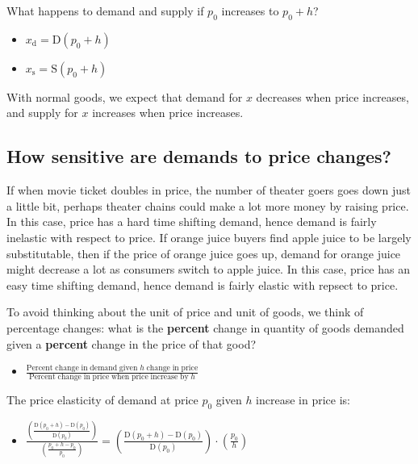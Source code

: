 \documentclass[
]{book}
\providecommand{\tightlist}{%
  \setlength{\itemsep}{0pt}\setlength{\parskip}{0pt}}
\begin{document}
What happens to demand and supply if \(p_0\) increases to \(p_0 +h\)?

\begin{itemize}
\item
  \(\displaystyle x_{\textrm{d}} =\textrm{D}(p_0 +h)\)
\item
  \(\displaystyle x_{\textrm{s}} =\textrm{S}(p_0 +h)\)
\end{itemize}

With normal goods, we expect that demand for \(x\) decreases when price
increases, and supply for \(x\) increases when price increases.

\hypertarget{how-sensitive-are-demands-to-price-changes}{%
\subsection{How sensitive are demands to price changes?}\label{how-sensitive-are-demands-to-price-changes}}

If when movie ticket doubles in price, the number of theater goers goes
down just a little bit, perhaps theater chains could make a lot more
money by raising price. In this case, price has a hard time shifting
demand, hence demand is fairly inelastic with respect to price. If
orange juice buyers find apple juice to be largely substitutable, then
if the price of orange juice goes up, demand for orange juice might
decrease a lot as consumers switch to apple juice. In this case, price
has an easy time shifting demand, hence demand is fairly elastic with
repsect to price.

To avoid thinking about the unit of price and unit of goods, we think of
percentage changes: what is the \textbf{percent} change in quantity of goods
demanded given a \textbf{percent} change in the price of that good?

\begin{itemize}
\tightlist
\item
  \(\displaystyle \frac{\textrm{Percent}\;\textrm{change}\;\textrm{in}\;\textrm{demand}\;\textrm{given}\;h\;\textrm{change}\;\textrm{in}\;\textrm{price}}{\textrm{Percent}\;\textrm{change}\;\textrm{in}\;\textrm{price}\;\textrm{when}\;\textrm{price}\;\textrm{increase}\;\textrm{by}\;h}\)
\end{itemize}

The price elasticity of demand at price \(p_0\) given \(h\) increase in
price is:

\begin{itemize}
\tightlist
\item
  \(\displaystyle \frac{\left(\frac{\textrm{D}(p_0 +h)-\textrm{D}(p_0 )}{\textrm{D}(p_0 )}\right)}{\left(\frac{p_0 +h-p_0 }{p_0 }\right)}=\left(\frac{\textrm{D}(p_0 +h)-\textrm{D}(p_0 )}{\textrm{D}(p_0 )}\right)\cdot \left(\frac{p_0 }{h}\right)\)
\end{itemize}
\end{document}
